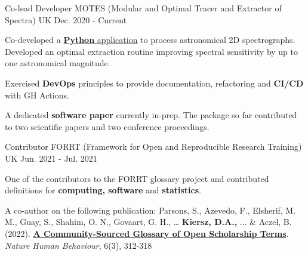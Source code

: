
\begin{cventries}

  \cventry
    {Co-lead Developer} %
    {MOTES (Modular and Optimal Tracer and Extractor of Spectra)} %
    {UK} %
    {Dec. 2020 - Current} %
    {
      \begin{cvitems} %
        \item Co-developed a \href{https://github.com/tseccull/motes}{\textbf{Python} application} to process astronomical 2D spectrographs. Developed an optimal extraction routine improving spectral sensitivity by up to one astronomical magnitude.
        \item Exercised \textbf{DevOps} principles to provide documentation, refactoring and\textbf{ CI/CD} with GH Actions.
        \item A dedicated \textbf{software paper} currently in-prep. The package so far contributed to two scientific papers and two conference proceedings.
      \end{cvitems}
    }



  \cventry
    {Contributor} %
    {FORRT (Framework for Open and Reproducible Research Training)} %
    {UK} %
    {Jun. 2021 - Jul. 2021} %
    {
      \begin{cvitems} %
		\item One of the contributors to the FORRT glossary project and contributed definitions for \textbf{computing, software} and \textbf{statistics}. 
		\item A co-author on the following publication: Parsons, S., Azevedo, F., Elsherif, M. M., Guay, S., Shahim, O. N., Govaart, G. H., … \textbf{Kiersz, D.A.,} ... \& Aczel, B. (2022). \textbf{\href{https://www.nature.com/articles/s41562-021-01269-4}{A Community-Sourced Glossary of Open Scholarship Terms}}. \textit{Nature Human Behaviour}, 6(3), 312-318
      \end{cvitems}
    }



\end{cventries}

